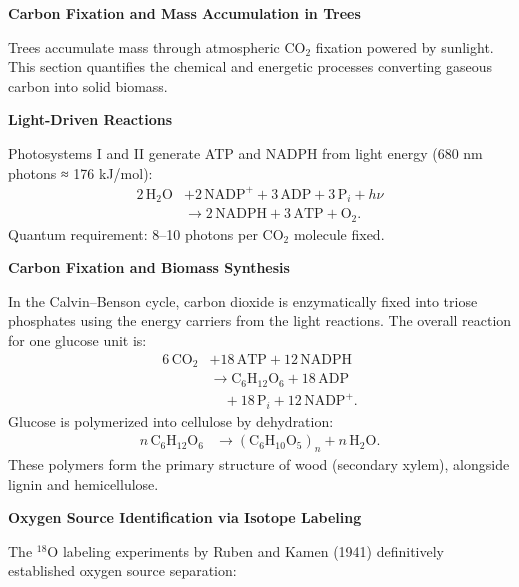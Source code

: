 \begin{technical}
{\Large\textbf{Carbon Fixation and Mass Accumulation in Trees}}

\vspace{0.3em}
\noindent Trees accumulate mass through atmospheric $\mathrm{CO}_2$ fixation powered by sunlight. This section quantifies the chemical and energetic processes converting gaseous carbon into solid biomass.

\vspace{0.5em}
\noindent\textbf{Light-Driven Reactions}

\vspace{0.2em}
\noindent Photosystems I and II generate ATP and NADPH from light energy (680 nm photons ≈ 176 kJ/mol):
\begin{align*}
2\,\mathrm{H}_2\mathrm{O} 
&+ 2\,\mathrm{NADP}^+ 
+ 3\,\mathrm{ADP} 
+ 3\,\mathrm{P}_i 
+ h\nu \nonumber \\
&\rightarrow 2\,\mathrm{NADPH} 
+ 3\,\mathrm{ATP} 
+ \mathrm{O}_2.
\end{align*}
Quantum requirement: 8–10 photons per $\mathrm{CO}_2$ molecule fixed.

\vspace{0.5em}
\noindent\textbf{Carbon Fixation and Biomass Synthesis}

\vspace{0.2em}
\noindent In the Calvin–Benson cycle, carbon dioxide is enzymatically fixed into triose phosphates using the energy carriers from the light reactions. The overall reaction for one glucose unit is:
\begin{align*}
6\,\mathrm{CO}_2 
&+ 18\,\mathrm{ATP} 
+ 12\,\mathrm{NADPH} \nonumber \\
&\rightarrow \mathrm{C}_6\mathrm{H}_{12}\mathrm{O}_6 
+ 18\,\mathrm{ADP} \nonumber \\
&\quad + 18\,\mathrm{P}_i 
+ 12\,\mathrm{NADP}^+.
\end{align*}
Glucose is polymerized into cellulose by dehydration:
\begin{align*}
n\,\mathrm{C}_6\mathrm{H}_{12}\mathrm{O}_6 
&\rightarrow (\mathrm{C}_6\mathrm{H}_{10}\mathrm{O}_5)_n 
+ n\,\mathrm{H}_2\mathrm{O}.
\end{align*}
These polymers form the primary structure of wood (secondary xylem), alongside lignin and hemicellulose.

\vspace{0.5em}
\noindent\textbf{Oxygen Source Identification via Isotope Labeling}

\vspace{0.2em}
\noindent The $^{18}\mathrm{O}$ labeling experiments by Ruben and Kamen (1941) definitively established oxygen source separation:


\end{technical}
